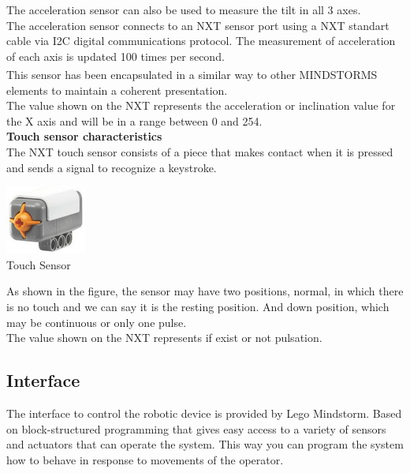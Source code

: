 \documentclass[a4paper,11pt]{article}
\begin{document}
\begin{multicols}{2}
				The acceleration sensor can also be used to measure the tilt in all 3 axes.\\
				
				The acceleration sensor connects to an NXT sensor port using a NXT standart cable via I2C digital communications protocol. The measurement of acceleration of each axis is updated 100 times per second.\\
				
				This sensor has been encapsulated in a similar way to other MINDSTORMS\textsuperscript{\textregistered} elements to maintain a coherent presentation.\\

				The value shown on the NXT represents the acceleration or inclination value for the X axis and will be in a range between 0 and 254.\\
				
				\textbf{Touch sensor characteristics}\\

				The NXT touch sensor consists of a piece that makes contact when it is pressed and sends a signal to recognize a keystroke.\\

				\begin{center}
					\includegraphics[scale=0.8]{img/sensorB.jpg}\\
					Touch Sensor
				\end{center}

				As shown in the figure, the sensor may have two positions, normal, in which there is no touch and we can say it is the resting position. And down position, which may be continuous or only one pulse.\\

				The value shown on the NXT represents if exist or not pulsation.

			\subsection{Interface}
			
				The interface to control the robotic device is provided by Lego Mindstorm. Based on block-structured programming that gives easy access to a variety of sensors and actuators that can operate the system. This way you can program the system how to behave in response to movements of the operator.
			

\end{multicols}
\end{document}
